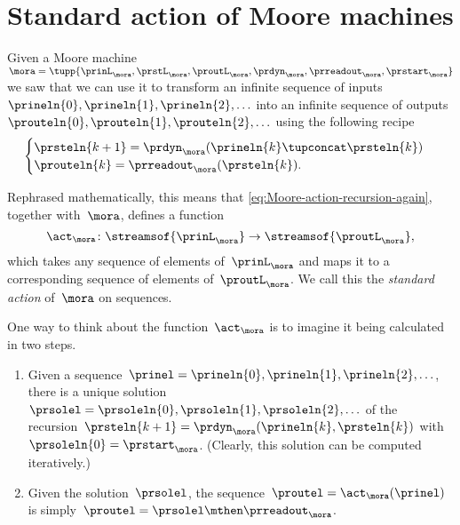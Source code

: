 
\section{Standard action of Moore machines}
\label{sec:Moore-acting-on-sequences}

Given a Moore machine~$\mora = \tupp{\prinL_\mora,\prstL_\mora,\proutL_\mora,\prdyn_\mora,\prreadout_\mora,\prstart_\mora}$
we saw that we can use it to transform an infinite sequence of inputs~$\prineln{0}, \prineln{1}, \prineln{2}, \ldots$ into an infinite sequence of outputs~$\prouteln{0}, \prouteln{1}, \prouteln{2}, \ldots$ using the following recipe
\begin{equation}
    \label{eq:Moore-action-recursion-again}
    \begin{cases}
        \prsteln{k+1} = \prdyn_\mora(\prineln{k} \tupconcat \prsteln{k}) \\
        \prouteln{k}   = \prreadout_\mora(\prsteln{k}).
    \end{cases}
\end{equation}

Rephrased mathematically, this means that \cref{eq:Moore-action-recursion-again}, together with~$\mora$, defines a function
\begin{equation}
    \act_{\mora} \colon \streamsof{\prinL_\mora}  \to \streamsof{\proutL_\mora},
\end{equation}
which takes any sequence of elements of~$\prinL_\mora$ and maps it to a corresponding sequence of elements of~$\proutL_\mora$.
We call this the \emph{standard action} of~$\mora$ on sequences.

\begin{remark}
    \label{re:moore-action-two-steps}
    One way to think about the function~$\act_{\mora}$ is to imagine it being calculated in two steps.
    \begin{enumerate}
        \item Given a sequence~$\prinel = \prineln{0}, \prineln{1}, \prineln{2}, \ldots$, there is a unique solution~$\prsolel = \prsoleln{0}, \prsoleln{1}, \prsoleln{2}, \ldots$ of the recursion~$\prsteln{k+1} = \prdyn_\mora(\prineln{k}, \prsteln{k})$ with~$\prsoleln{0} = \prstart_\mora$.
              (Clearly, this solution can be computed iteratively.)
        \item Given the solution~$\prsolel$, the sequence~$\proutel = \act_{\mora}(\prinel)$ is simply~$\proutel = \prsolel \mthen \prreadout_\mora$.
    \end{enumerate}
\end{remark}

